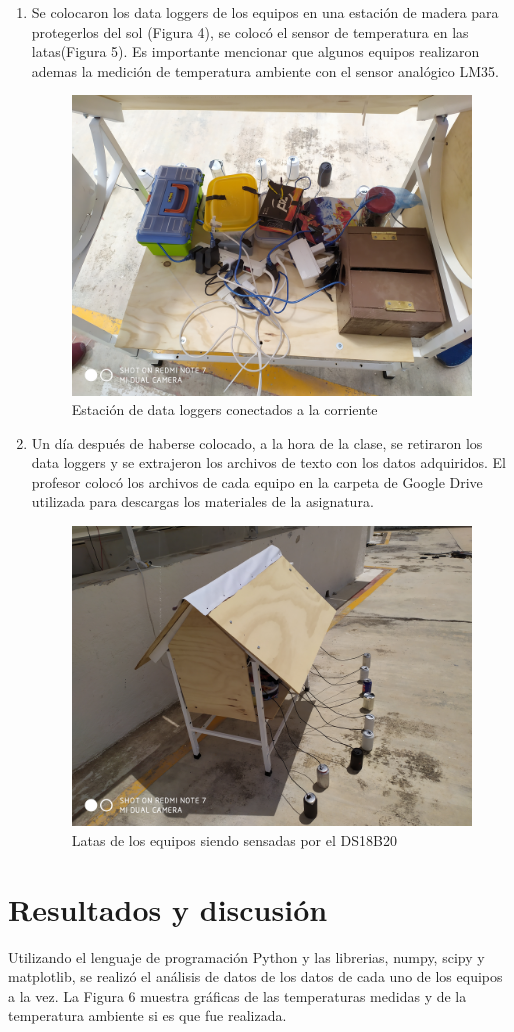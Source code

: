 \documentclass[11pt,twocolumn,letterpaper,spanish]{article}
\begin{document}
\begin{enumerate}
\item Se colocaron los data loggers de los equipos en una estación de madera para protegerlos del sol (Figura 4), se colocó el sensor de temperatura en las latas(Figura 5). Es importante mencionar que algunos equipos realizaron ademas la medición de temperatura ambiente con el sensor analógico LM35.

\begin{figure}[h]
   \centering
   \includegraphics[width = 6 cm]{Imagenes/estacion}
   \caption{Estación de data loggers conectados a la corriente}
\end{figure}

\item Un día después de haberse colocado, a la hora de la clase, se retiraron los data loggers y se extrajeron los archivos de texto con los datos adquiridos. El profesor colocó los archivos de cada equipo en la carpeta de Google Drive utilizada para descargas los materiales de la asignatura.

\begin{figure}[h]
   \centering
   \includegraphics[width = 6 cm, height = 3.8 cm ]{Imagenes/latas}
   \caption{Latas de los equipos siendo sensadas por el DS18B20}
\end{figure}

\end{enumerate}

\section*{Resultados y discusión}

Utilizando el lenguaje de programación Python y las librerias, numpy, scipy y matplotlib, se realizó el análisis de datos de los datos de cada uno de los equipos a la vez. La Figura 6 muestra gráficas de las temperaturas medidas y de la temperatura ambiente si es que fue realizada.
\end{document}
